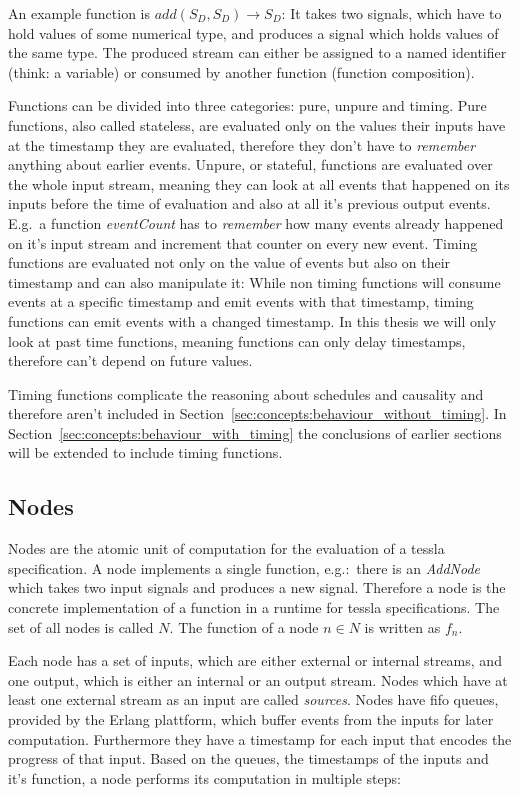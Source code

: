 An example function is \(add(S_D,S_D) \rightarrow S_D\): It takes two signals, which have to hold values of some numerical type, and produces a signal which holds values of the same type.
The produced stream can either be assigned to a named identifier (think: a variable) or consumed by another function (function composition).

Functions can be divided into three categories: pure, unpure and timing.
Pure functions, also called stateless, are evaluated only on the values their inputs have at the timestamp they are evaluated, therefore they don't have to \emph{remember} anything about earlier events.
Unpure, or stateful, functions are evaluated over the whole input stream, meaning they can look at all events that happened on its inputs before the time of evaluation and also at all it's previous output events.
E.g.\ a function \emph{eventCount} has to \emph{remember} how many events already happened on it's input stream and increment that counter on every new event.
Timing functions are evaluated not only on the value of events but also on their timestamp and can also manipulate it:
While non timing functions will consume events at a specific timestamp and emit events with that timestamp, timing functions can emit events with a changed timestamp.
In this thesis we will only look at past time functions, meaning functions can only delay timestamps, therefore can't depend on future values.

Timing functions complicate the reasoning about schedules and causality and therefore aren't included in Section~\ref{sec:concepts:behaviour_without_timing}.
In Section~\ref{sec:concepts:behaviour_with_timing} the conclusions of earlier sections will be extended to include timing functions.


\subsection{Nodes}
\label{sec:concepts:defs:nodes}

Nodes are the atomic unit of computation for the evaluation of a \gls{tessla} specification.
A node implements a single function, e.g.:\ there is an \emph{AddNode} which takes two input signals and produces a new signal.
Therefore a node is the concrete implementation of a function in a runtime for \gls{tessla} specifications.
The set of all nodes is called \(N\).
The function of a node \(n \in N\) is written as \(f_n\).

Each node has a set of inputs, which are either external or internal streams, and one output, which is either an internal or an output stream.
Nodes which have at least one external stream as an input are called \emph{sources}.
Nodes have \gls{fifo} queues, provided by the Erlang plattform, which buffer events from the inputs for later computation.
Furthermore they have a timestamp for each input that encodes the progress of that input.
Based on the queues, the timestamps of the inputs and it's function, a node performs its computation in multiple steps:

